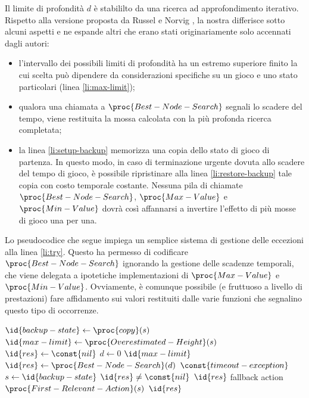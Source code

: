 \documentclass{article}
\begin{document}
Il limite di profondità $d$ è stabililto da una ricerca ad approfondimento
iterativo. Rispetto alla versione proposta da Russel e Norvig
\cite{at.UBO029034619980101.109--111}, la nostra differisce sotto alcuni aspetti
e ne espande altri che erano stati originariamente solo accennati dagli autori:
\begin{itemize}
    \item l'intervallo dei possibili limiti di profondità ha un estremo
      superiore finito la cui scelta può dipendere da considerazioni specifiche
      su un gioco e uno stato particolari (linea \ref{li:max-limit});
    \item qualora una chiamata a $\proc{Best-Node-Search}$ segnali lo scadere
      del tempo, viene restituita la mossa calcolata con la più profonda ricerca
      completata;
    \item la linea \ref{li:setup-backup} memorizza una copia dello stato di
      gioco di partenza. In questo modo, in caso di terminazione urgente dovuta
      allo scadere del tempo di gioco, è possibile ripristinare alla linea
      \ref{li:restore-backup} tale copia con costo temporale costante. Nessuna
      pila di chiamate $\proc{Best-Node-Search}$, $\proc{Max-Value}$ e
      $\proc{Min-Value}$ dovrà così affannarsi a invertire l'effetto di più
      mosse di gioco una per una.
\end{itemize}
\begin{sloppypar}
Lo pseudocodice che segue impiega un semplice sistema di gestione delle
eccezioni alla linea \ref{li:try}. Questo ha permesso di codificare
$\proc{Best-Node-Search}$ ignorando la gestione delle scadenze temporali, che
viene delegata a ipotetiche implementazioni di $\proc{Max-Value}$ e
$\proc{Min-Value}$. Ovviamente, è comunque possibile (e fruttuoso a livello di
prestazioni) fare affidamento sui valori restituiti dalle varie funzioni che
segnalino questo tipo di occorrenze.
\end{sloppypar}

\begin{codebox}
  \li  $\id{backup-state} \gets \proc{copy}(s)$ \label{li:setup-backup}
  \li  $\id{max-limit} \gets \proc{Overestimated-Height}(s)$
       \label{li:max-limit}
  \li  $\id{res} \gets \const{nil}$
  \li  \For $d \gets 0$ \To $\id{max-limit}$
  \li    \Do
            \label{li:try}
  \li        \Do
               $\id{res} \gets \proc{Best-Node-Search}(d)$
             \End
  \li      {} $\const{timeout-exception}$
  \li        \Do
               $s \gets \id{backup-state}$ \label{li:restore-backup}
  \li          \If $\id{res} \neq \const{nil}$
  \li            \Then
                   \Return $\id{res}$
                 \End
  \li          \Comment fallback action
  \li          \Return $\proc{First-Relevant-Action}(s)$
             \End
         \End
  \li  \Return $\id{res}$
\end{codebox}
\end{document}
